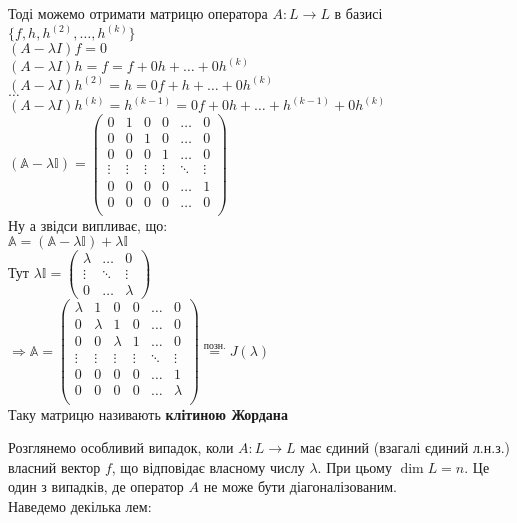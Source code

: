 \documentclass[a4paper, 10pt]{article}
\theoremstyle{theoremdd}
\theoremstyle{theoremdd}
\theoremstyle{theoremdd}
\theoremstyle{theoremdd}
\theoremstyle{theoremdd}
\theoremstyle{theoremdd}
\theoremstyle{theoremdd}
\theoremstyle{theoremdd}
\begin{document}
Тоді можемо отримати матрицю оператора $A: L \to L$ в базисі $\{f,h,h^{(2)},\dots,h^{(k)}\}$\\
$(A-\lambda I)f = 0$\\
$(A-\lambda I)h = f = f + 0h + \dots + 0h^{(k)}$\\
$(A-\lambda I)h^{(2)} = h = 0f + h + \dots + 0h^{(k)}$\\
$\dots$\\
$(A-\lambda I)h^{(k)} = h^{(k-1)} = 0f + 0h + \dots + h^{(k-1)} + 0h^{(k)}$\\
$(\mathbb{A}- \lambda \mathbb{I}) = \begin{pmatrix}
0 & 1 & 0 & 0 & \dots & 0 \\
0 & 0 & 1 & 0 & \dots & 0 \\
0 & 0 & 0 & 1 & \dots & 0 \\
\vdots & \vdots & \vdots & \vdots & \ddots & \vdots \\
0 & 0 & 0 & 0 & \dots & 1 \\
0 & 0 & 0 & 0 & \dots & 0 \\
\end{pmatrix}$\\
Ну а звідси випливає, що:\\
$\mathbb{A} = (\mathbb{A} - \lambda \mathbb{I}) + \lambda \mathbb{I}$\\
Тут $\lambda \mathbb{I} = \begin{pmatrix}
\lambda & \dots & 0\\
\vdots & \ddots & \vdots\\
0 & \dots & \lambda
\end{pmatrix}$\\
$\Rightarrow \mathbb{A} = \begin{pmatrix}
\lambda & 1 & 0 & 0 & \dots & 0 \\
0 & \lambda & 1 & 0 & \dots & 0 \\
0 & 0 & \lambda & 1 & \dots & 0 \\
\vdots & \vdots & \vdots & \vdots & \ddots & \vdots \\
0 & 0 & 0 & 0 & \dots & 1 \\
0 & 0 & 0 & 0 & \dots & \lambda \\
\end{pmatrix} \overset{\textrm{позн.}}{=} J(\lambda)$\\
Таку матрицю називають \textbf{клітиною Жордана}
\fi

Розглянемо особливий випадок, коли $A: L \to L$ має єдиний (взагалі єдиний л.н.з.) власний вектор $f$, що відповідає власному числу $\lambda$. При цьому $\dim L = n$. Це один з випадків, де оператор $A$ не може бути діагоналізованим.\\
Наведемо декілька лем:
\end{document}
